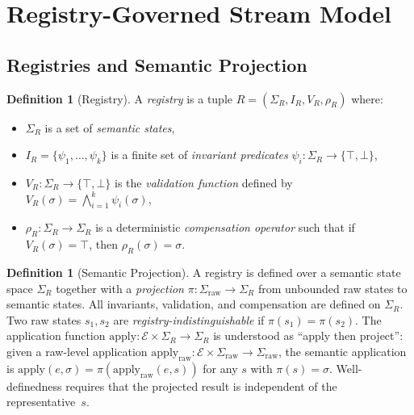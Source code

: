 \documentclass[11pt,a4paper]{article}
\theoremstyle{plain}
\theoremstyle{definition}
\newtheorem{definition}[theorem]{Definition}
\theoremstyle{remark}
\renewcommand{\_}{\textunderscore\allowbreak}
\begin{document}
\section{Registry-Governed Stream Model}
\label{sec:model}

\subsection{Registries and Semantic Projection}

\begin{definition}[Registry]
\label{def:registry}
A \emph{registry} is a tuple $R = (\Sigma_R, I_R, V_R, \rho_R)$ where:
\begin{itemize}[leftmargin=*,nosep]
\item $\Sigma_R$ is a set of \emph{semantic states},
\item $I_R = \{\psi_1, \ldots, \psi_k\}$ is a finite set of \emph{invariant
  predicates} $\psi_i: \Sigma_R \to \{\top, \bot\}$,
\item $V_R: \Sigma_R \to \{\top, \bot\}$ is the \emph{validation function}
  defined by $V_R(\sigma) = \bigwedge_{i=1}^k \psi_i(\sigma)$,
\item $\rho_R: \Sigma_R \to \Sigma_R$ is a deterministic \emph{compensation
  operator} such that if $V_R(\sigma) = \top$, then
  $\rho_R(\sigma) = \sigma$.
\end{itemize}
\end{definition}

\begin{definition}[Semantic Projection]
\label{def:projection}
A registry is defined over a semantic state space $\Sigma_R$ together with
a \emph{projection} $\pi: \Sigma_{\mathrm{raw}} \to \Sigma_R$ from
unbounded raw states to semantic states.  All invariants, validation, and
compensation are defined on $\Sigma_R$.  Two raw states $s_1, s_2$ are
\emph{registry-indistinguishable} if $\pi(s_1) = \pi(s_2)$.
The application function $\mathrm{apply}: \mathcal{E} \times \Sigma_R \to \Sigma_R$
is understood as ``apply then project'': given a raw-level application
$\mathrm{apply}_{\mathrm{raw}}: \mathcal{E} \times \Sigma_{\mathrm{raw}} \to \Sigma_{\mathrm{raw}}$,
the semantic application is
$\mathrm{apply}(e, \sigma) = \pi(\mathrm{apply}_{\mathrm{raw}}(e, s))$ for
any $s$ with $\pi(s) = \sigma$.  Well-definedness requires that the projected
result is independent of the representative~$s$.
\end{definition}
\end{document}
